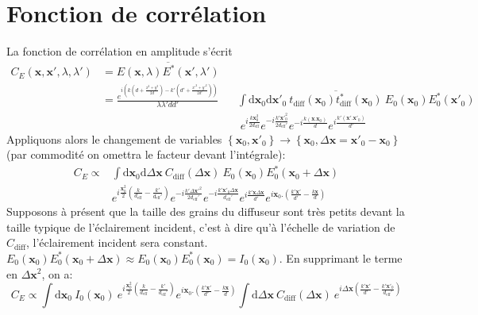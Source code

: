 \section{Fonction de corrélation}
La fonction de corrélation en amplitude s'écrit
\begin{align}
C_E(\mathbf{x},\mathbf{x}',\lambda,\lambda')&=\overline{E(\mathbf{x},\lambda) E^*(\mathbf{x}',\lambda')} \\
\nonumber &=\frac{e^{i \left( k (d+ \frac{x^2+y^2}{2d})-k'(d'+\frac{x'^2+y'^2}{2d'}) \right)}}{\lambda \lambda' d d'} 
&& \int{ \mathrm{d}\mathbf{x}_0 \mathrm{d}\mathbf{x}'_0 \: \overline{t_{\mathrm{diff}}(\mathbf{x}_0) t^*_{\mathrm{diff}}(\mathbf{x}_0)} \: E_0(\mathbf{x}_0) E^*_0(\mathbf{x}'_0)} \\ 
& && \; e^{i\frac{k \mathbf{x}^2_0}{2d_{\mathrm{eff}}}} e^{-i\frac{k' \mathbf{x}'^2_0}{2d_{\mathrm{eff}}'}} e^{-i\frac{k(\mathbf{x}.\mathbf{x}_0)}{d}} e^{i\frac{k'(\mathbf{x}'.\mathbf{x}'_0)}{d'}}
\end{align}
Appliquons alors le changement de variables $\left\lbrace \mathbf{x}_0, \mathbf{x}'_0\right\rbrace \rightarrow \left\lbrace \mathbf{x}_0, \Delta\mathbf{x}= \mathbf{x}'_0-\mathbf{x}_0\right\rbrace$ (par commodité on omettra le facteur devant l'intégrale):
\begin{align}
  C_E \propto &\int{\mathrm{d}\mathbf{x}_0 \mathrm{d}\Delta\mathbf{x} \: C_{\mathrm{diff}}(\Delta\mathbf{x}) \: E_0(\mathbf{x}_0)E^*_0(\mathbf{x}_0+\Delta\mathbf{x})} \\ 
  \nonumber & e^{i \frac{\mathbf{x}^2_0}{2}(\frac{k}{d_{\mathrm{eff}}}-\frac{k'}{d_{\mathrm{eff}}'})} e^{-i\frac{k'\Delta\mathbf{x}'^2}{2d_{\mathrm{eff}}'}} e^{-i\frac{k'\mathbf{x}'_0 \Delta\mathbf{x}}{d_{\mathrm{eff}}'}} e^{i\frac{k'\mathbf{x} \Delta\mathbf{x}}{d'}} e^{i \mathbf{x}_0.(\frac{k'\mathbf{x}'}{d'}-\frac{k\mathbf{x}}{d})}
\end{align}
Supposons à présent que la taille des grains du diffuseur sont très petits devant la taille typique de l'éclairement incident, c'est à dire qu'à l'échelle de variation de $C_{\mathrm{diff}}$, l'éclairement incident sera constant. $E_0(\mathbf{x}_0)E^*_0(\mathbf{x}_0+\Delta\mathbf{x}) \approx E_0(\mathbf{x}_0)E^*_0(\mathbf{x}_0)=I_0(\mathbf{x}_0)$. En supprimant le terme en $\Delta\mathbf{x}^2$, on a: 
\begin{equation}
C_E \propto \int{\mathrm{d}\mathbf{x}_0  \: I_0(\mathbf{x}_0) \: e^{i \frac{\mathbf{x}^2_0}{2}(\frac{k}{d_{\mathrm{eff}}}-\frac{k'}{d_{\mathrm{eff}}'})} e^{i \mathbf{x}_0.(\frac{k'\mathbf{x}'}{d'}-\frac{k\mathbf{x}}{d})} \int{\mathrm{d}\Delta\mathbf{x} \: C_{\mathrm{diff}}(\Delta\mathbf{x}) \: e^{i \Delta\mathbf{x} (\frac{k'\mathbf{x}'}{d'}-\frac{k'\mathbf{x'}_0}{d_{\mathrm{eff}}'})}}}
\end{equation}


